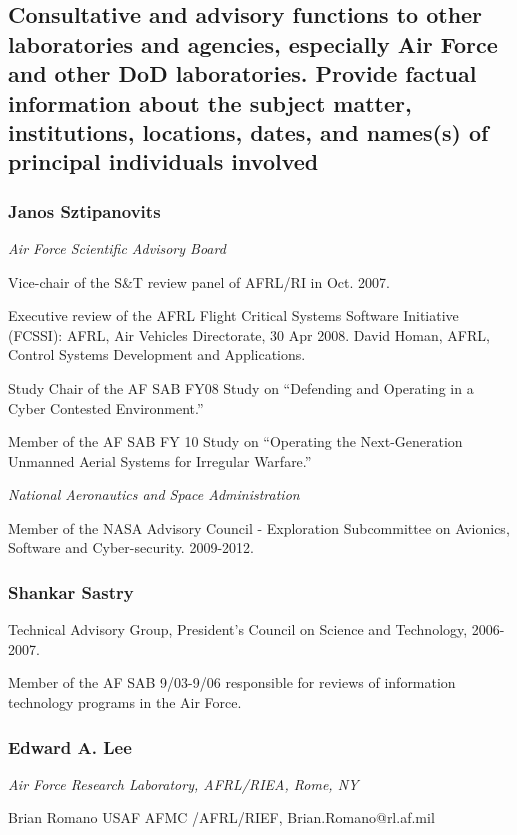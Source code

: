 \subsection{Consultative and advisory functions to other laboratories and agencies, especially Air Force and other DoD laboratories. Provide factual information about the subject matter, institutions, locations, dates, and names(s) of principal individuals involved}

\subsubsection{Janos Sztipanovits}

\emph{Air Force Scientific Advisory Board}

Vice-chair of the S\&T review panel of AFRL/RI in Oct. 2007.

Executive review of the AFRL Flight Critical Systems Software Initiative (FCSSI): AFRL, Air Vehicles Directorate, 30 Apr 2008.  David Homan, AFRL, Control Systems Development and Applications.

Study Chair of the AF SAB FY08 Study on ``Defending and Operating in a Cyber Contested Environment.''

Member of the AF SAB FY 10 Study on ``Operating the Next-Generation Unmanned Aerial Systems for Irregular Warfare.''

\emph{National Aeronautics and Space Administration}

Member of the NASA Advisory Council - Exploration Subcommittee on Avionics, Software and Cyber-security. 2009-2012.


\subsubsection{Shankar Sastry}

Technical Advisory Group, President's Council on Science and Technology, 2006-2007.

Member of the AF SAB 9/03-9/06 responsible for reviews of information technology programs in the Air Force.


                 \subsubsection{Edward A. Lee} 
                 \emph{Air Force Research Laboratory, AFRL/RIEA, Rome, NY}

                 Brian Romano USAF AFMC /AFRL/RIEF, Brian.Romano@rl.af.mil

